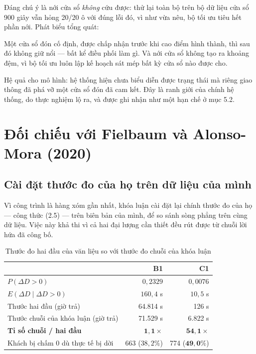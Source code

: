 Đáng chú ý là nới cửa sổ \emph{không} cứu được: thử lại toàn bộ trên bộ dữ liệu cửa sổ 900 giây
vẫn hỏng 20/20 ô với đúng lỗi đó, vì như vừa nêu, bộ tối ưu tiêu hết phần nới. Phát biểu tổng
quát:

\begin{khungy}
Một cửa sổ đón cố định, được chấp nhận trước khi cao điểm hình thành, thì sau đó không giữ nổi
--- bất kể điều phối làm gì. Và nới cửa sổ không tạo ra khoảng đệm, vì bộ tối ưu luôn lập kế
hoạch sát mép bất kỳ cửa sổ nào được cho.
\end{khungy}

Hệ quả cho mô hình: hệ thống hiện chưa biểu diễn được trạng thái mà riêng giao thông đã phá vỡ
một cửa sổ đón đã cam kết. Đây là ranh giới của chính hệ thống, do thực nghiệm lộ ra, và được
ghi nhận như một hạn chế ở mục 5.2.

\section{Đối chiếu với Fielbaum và Alonso-Mora (2020)}
\label{muc:doichieu}

\subsection{Cài đặt thước đo của họ trên dữ liệu của mình}

Vì công trình \cite{fielbaum2020} là hàng xóm gần nhất, khóa luận cài đặt lại chính thước đo
của họ --- công thức (2.5) --- trên biên bản của mình, để so sánh sòng phẳng trên cùng dữ liệu.
Việc này khả thi vì cả hai đại lượng cần thiết đều rút được từ chuỗi lời hứa đã công bố.

\begin{table}[htbp]
\centering
\caption{Thước đo hai đầu của văn liệu so với thước đo chuỗi của khóa luận}
\label{bang:doichieu}
\small
\begin{tabular}{@{}lrr@{}}
\toprule
& \textbf{B1} & \textbf{C1}\\
\midrule
$P(\Delta D > 0)$ & $0{,}2329$ & $0{,}0076$\\
$E(\Delta D \mid \Delta D > 0)$ & $160{,}4$ s & $10{,}5$ s\\
Thước hai đầu (giờ trả) & 64.814 s & 126 s\\
Thước chuỗi của khóa luận (giờ trả) & 71.529 s & 6.822 s\\
\textbf{Tỉ số chuỗi / hai đầu} & $\mathbf{1{,}1\times}$ & $\mathbf{54{,}1\times}$\\
Khách bị chấm 0 dù thực tế bị dời & 663 ($38{,}2\%$) & 774 ($\mathbf{49{,}0\%}$)\\
\bottomrule
\end{tabular}
\end{table}

